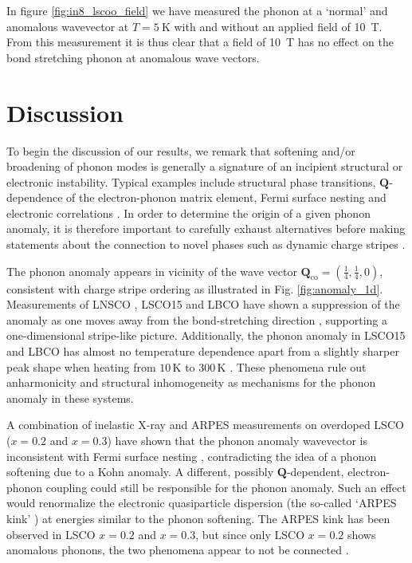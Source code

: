 In figure \ref{fig:in8_lscoo_field} we have measured the phonon at a `normal' and anomalous wavevector at $T=\SI{5}{\kelvin}$ with and without an applied field of \SI{10}{\tesla}. From this measurement it is thus clear that a field of \SI{10}{\tesla} has no effect on the bond stretching phonon at anomalous wave vectors. 

\section{Discussion}
To begin the discussion of our results, we remark that softening and/or broadening of phonon modes is generally a signature of an incipient structural or electronic instability. Typical examples include structural phase transitions, $\bm{Q}$-dependence of the electron-phonon matrix element, Fermi surface nesting and electronic correlations \cite{Reznik2012}. In order to determine the origin of a given phonon anomaly, it is therefore important to carefully exhaust alternatives before making statements about the connection to novel phases such as dynamic charge stripes \cite{Reznik2012}.

The phonon anomaly appears in vicinity of the wave vector $\bm{Q}_\text{co}=(\frac{1}{4},\frac{1}{4},0)$, consistent with charge stripe ordering as illustrated in Fig. \ref{fig:anomaly_1d}. Measurements of LNSCO \cite{Reznik2008b}, LSCO15 \cite{Reznik2007} and LBCO \cite{Reznik2007} have shown a suppression of the anomaly as one moves away from the bond-stretching direction \cite{Reznik2008b}, supporting a one-dimensional stripe-like picture. Additionally, the phonon anomaly in LSCO15 and LBCO has almost no temperature dependence apart from a slightly sharper peak shape when heating from $10\,\text{K}$ to $300\,\text{K}$ \cite{Reznik2006,Reznik2007}. These phenomena rule out anharmonicity and structural inhomogeneity as mechanisms for the phonon anomaly in these systems.

A combination of inelastic X-ray and ARPES measurements on overdoped LSCO ($x=0.2$ and $x=0.3$) have shown that the phonon anomaly wavevector is inconsistent with Fermi surface nesting \cite{Park2013,Park2014}, contradicting the idea of a phonon softening due to a Kohn anomaly. A different, possibly $\bm{Q}$-dependent, electron-phonon coupling could still be responsible for the phonon anomaly. Such an effect would renormalize the electronic quasiparticle dispersion (the so-called `ARPES kink' \cite{Garcia2010}) at energies similar to the phonon softening. The ARPES kink has been observed in LSCO $x=0.2$ and $x=0.3$, but since only LSCO $x=0.2$ shows anomalous phonons, the two phenomena appear to not be connected \cite{Park2014}.

